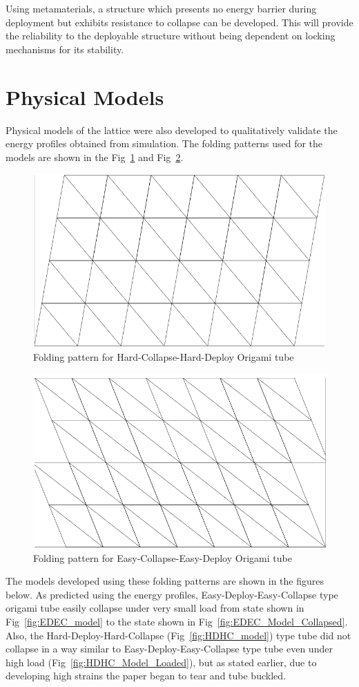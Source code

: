 Using metamaterials, a structure which presents no energy barrier during deployment but exhibits resistance to collapse can be developed. This will provide the reliability to the deployable structure without being dependent on locking mechanisms for its stability.

\section{Physical Models}
Physical models of the lattice were also developed to qualitatively validate the energy profiles obtained from simulation. The folding patterns used for the models are shown in the Fig~\ref{fig:HCHD_fold} and Fig~\ref{fig:ECED_fold}.
\begin{figure}[htbp]
    \centering
    \includegraphics[width = 0.5\linewidth]{Figures/50_50_180_fold.png}
    \caption{Folding pattern for Hard-Collapse-Hard-Deploy Origami tube}
    \label{fig:HCHD_fold}
\end{figure}
\begin{figure}[htbp]
    \centering
    \includegraphics[width = 0.5\linewidth]{Figures/38_30_112_fold.png}
    \caption{Folding pattern for Easy-Collapse-Easy-Deploy Origami tube}
    \label{fig:ECED_fold}
\end{figure}

The models developed using these folding patterns are shown in the figures below. As predicted using the energy profiles, Easy-Deploy-Easy-Collapse type origami tube easily collapse under very small load from state shown in Fig~\ref{fig:EDEC_model} to the state shown in Fig~\ref{fig:EDEC_Model_Collapsed}. Also, the Hard-Deploy-Hard-Collapse (Fig~\ref{fig:HDHC_model}) type tube did not collapse in a way similar to Easy-Deploy-Easy-Collapse type tube even under high load (Fig~\ref{fig:HDHC_Model_Loaded}), but as stated earlier, due to developing high strains the paper began to tear and tube buckled.

